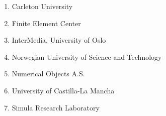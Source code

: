 \begin{enumerate}
\item
 Carleton University\\
\item
 Finite Element Center\\
\item
 InterMedia, University of Oslo\\
\item
 Norwegian University of Science and Technology\\
\item
 Numerical Objects A.S.\\
\item
 University of Castilla-La Mancha\\
\item
 Simula Research Laboratory\\
\end{enumerate}